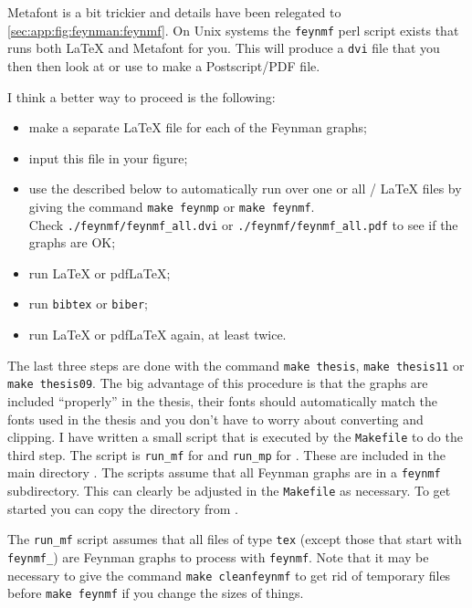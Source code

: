 Metafont is a bit trickier and details have been relegated to
\cref{sec:app:fig:feynman:feynmf}. 
On Unix systems the \texttt{feynmf} perl script exists that runs both \LaTeX{} and
Metafont for you. This will produce a \texttt{dvi} file that you then
then look at or use to make a Postscript/PDF file.

I think a better way to proceed is the following:
\begin{itemize}
\item make a separate \LaTeX{} file for each of the Feynman graphs;
\item input this file in your figure;
\item use the  described below to automatically run
  over one or all / \LaTeX{} files by giving the
  command \texttt{make feynmp} or \texttt{make feynmf}.\\
  Check
  \texttt{./feynmf/feynmf\_all.dvi} or
  \texttt{./feynmf/feynmf\_all.pdf} to see if the graphs are OK\@;
\item run \LaTeX{} or pdf\LaTeX; %
\item run \texttt{bibtex} or \texttt{biber};
\item run \LaTeX{} or pdf\LaTeX{} again, at least twice.
\end{itemize}
The last three steps are done with the command \texttt{make thesis},
\texttt{make thesis11} or
\texttt{make thesis09}.
The big advantage of this procedure is that the graphs are included
\enquote{properly} in the thesis, their fonts should automatically
match the fonts used in the thesis and you don't have to worry about
converting and clipping. I have written a small script that is
executed by the \texttt{Makefile} to do the third step.
The script is \texttt{run\_mf} for  and
\texttt{run\_mp} for . These are
included in the main directory .
The scripts assume that all Feynman graphs are in 
a \texttt{feynmf} subdirectory. This can clearly be
adjusted in the \texttt{Makefile} as necessary.
To get started you can copy the  directory from .

The \texttt{run\_mf} script assumes that all files of type
\texttt{tex} (except those that start with \texttt{feynmf\_}) are
Feynman graphs to process with \texttt{feynmf}. Note that it may be
necessary to give the command \texttt{make cleanfeynmf} to get rid of
temporary files before \texttt{make feynmf} if you change the sizes of
things.

